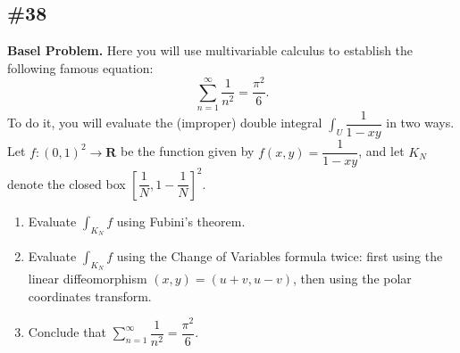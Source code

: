 \documentclass{article}
\newcommand{\R}{\mathbf{R}}
\theoremstyle{plain} %
\numberwithin{thm}{section} %
\theoremstyle{definition}
\begin{document}
        \subsection{\#38}
        \textbf{Basel Problem.} Here you will use multivariable calculus to establish the following famous equation:
        \[ \sum_{n=1}^\infty \dfrac{1}{n^2} = \dfrac{\pi^2}6. \]
        To do it, you will evaluate the (improper) double integral $\displaystyle \int_U \dfrac{1}{1-xy}$ in two ways. Let $f:(0,1)^2\rightarrow \R$ be the function given by $f(x,y)=\dfrac{1}{1-xy}$, and let $K_N$ denote the closed box $\left[\dfrac{1}N,1-\dfrac{1}{N}\right]^2$.
        \begin{enumerate}[label=(\alph*)]
            \item Evaluate $\displaystyle\int_{K_N} f$ using Fubini's theorem.

            \item Evaluate $\displaystyle\int_{K_N} f$ using the Change of Variables formula twice: first using the linear diffeomorphism $(x,y)=(u+v,u-v)$, then using the polar coordinates transform.

            \item Conclude that $\sum_{n=1}^\infty \dfrac{1}{n^2} = \dfrac{\pi^2}6$.
        \end{enumerate}
\end{document}
